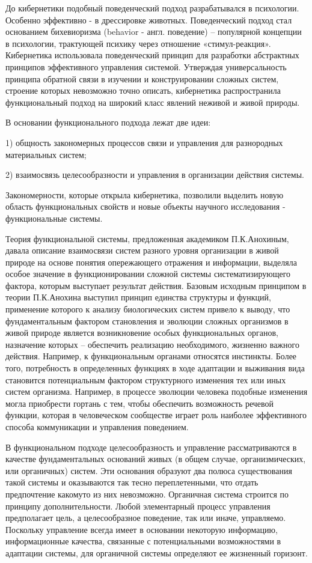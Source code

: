 \documentclass[exam_answers.tex]{subfiles}
\begin{document}
До кибернетики подобный поведенческий подход разрабатывался в
психологии. Особенно эффективно - в дрессировке животных. Поведенческий
подход стал основанием бихевиоризма (behavior - англ. поведение) –
популярной концепции в психологии, трактующей психику через отношение
«стимул-реакция». Кибернетика использовала поведенческий принцип для
разработки абстрактных принципов эффективного управления системой.
Утверждая универсальность принципа обратной связи в изучении и
конструировании сложных систем, строение которых невозможно точно
описать, кибернетика распространила функциональный подход на широкий
класс явлений неживой и живой природы.

В основании функционального подхода лежат две идеи:

1) общность закономерных процессов связи и управления для разнородных
материальных систем;

2) взаимосвязь целесообразности и управления в организации действия системы.

Закономерности, которые открыла кибернетика, позволили выделить новую
область функциональных свойств и новые объекты научного исследования -
функциональные системы.

Теория функциональной системы, предложенная академиком П.К.Анохиным,
давала описание взаимосвязи систем разного уровня организации в живой природе на
основе понятия опережающего отражения и информации, выделяла особое значение
в функционировании сложной системы систематизирующего фактора, которым
выступает результат действия. Базовым исходным принципом в теории П.К.Анохина
выступил принцип единства структуры и функций, применение которого к анализу
биологических систем привело к выводу, что фундаментальным фактором
становления и эволюции сложных организмов в живой природе является
возникновение особых функциональных органов, назначение которых – обеспечить
реализацию необходимого, жизненно важного действия. Например, к
функциональным органами относятся инстинкты. Более того, потребность в
определенных функциях в ходе адаптации и выживания вида становится
потенциальным фактором структурного изменения тех или иных систем организма.
Например, в процессе эволюции человека подобные изменения могла приобрести
гортань с тем, чтобы обеспечить возможность речевой функции, которая в
человеческом сообществе играет роль наиболее эффективного способа
коммуникации и управления поведением.

В функциональном подходе целесообразность и управление рассматриваются в
качестве фундаментальных оснований живых (в общем случае, организмических, или 
органичных) систем. Эти основания образуют два полюса существования такой
системы и оказываются так тесно переплетенными, что отдать предпочтение какомуто из них невозможно. Органичная система строится по принципу дополнительности.
Любой элементарный процесс управления предполагает цель, а целесообразное
поведение, так или иначе, управляемо. Поскольку управление всегда имеет в
основании некоторую информацию, информационные качества, связанные с
потенциальными возможностями в адаптации системы, для органичной системы
определяют ее жизненный горизонт.
\end{document}
